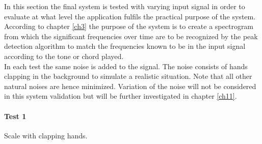 In this section the final system is tested with varying input signal in order to evaluate at what level the application fulfils the practical purpose of the system. According to chapter \ref{ch3} the purpose of the system is to create a spectrogram from which the significant frequencies over time are to be recognized by the peak detection algorithm to match the frequencies known to be in the input signal according to the tone or chord played. \\
In each test the same noise is added to the signal. The noise consists of hands clapping in the background to simulate a realistic situation. Note that all other natural noises are hence minimized. Variation of the noise will not be considered in this system validation but will be further investigated in chapter \ref{ch11}.

\paragraph{Test 1} Scale with clapping hands.
